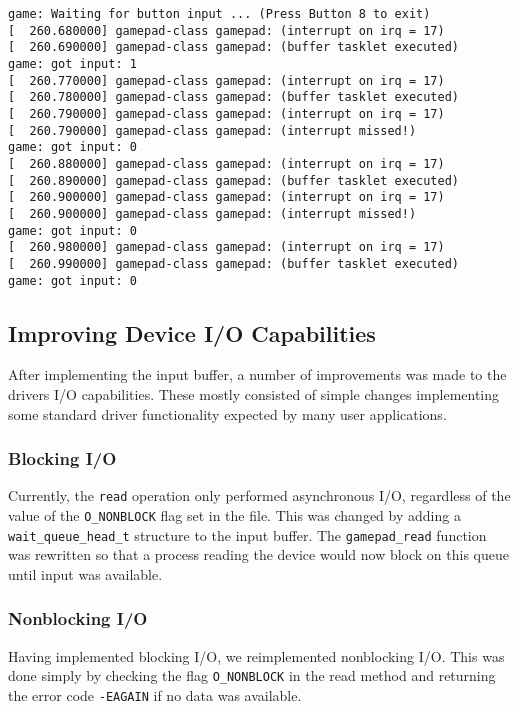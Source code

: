 \begin{lstlisting}[caption=Buffered read with rapid input. The program output was sorted.,label=lst:buffered-read-rapid-input]
game: Waiting for button input ... (Press Button 8 to exit)
[  260.680000] gamepad-class gamepad: (interrupt on irq = 17)
[  260.690000] gamepad-class gamepad: (buffer tasklet executed)
game: got input: 1
[  260.770000] gamepad-class gamepad: (interrupt on irq = 17)
[  260.780000] gamepad-class gamepad: (buffer tasklet executed)
[  260.790000] gamepad-class gamepad: (interrupt on irq = 17)
[  260.790000] gamepad-class gamepad: (interrupt missed!)
game: got input: 0
[  260.880000] gamepad-class gamepad: (interrupt on irq = 17)
[  260.890000] gamepad-class gamepad: (buffer tasklet executed)
[  260.900000] gamepad-class gamepad: (interrupt on irq = 17)
[  260.900000] gamepad-class gamepad: (interrupt missed!)
game: got input: 0
[  260.980000] gamepad-class gamepad: (interrupt on irq = 17)
[  260.990000] gamepad-class gamepad: (buffer tasklet executed)
game: got input: 0
\end{lstlisting}

\subsection{Improving Device I/O Capabilities}
After implementing the input buffer, a number of improvements was made to the drivers I/O capabilities. These mostly consisted of simple changes implementing some standard driver functionality expected by many user applications.

\subsubsection{Blocking I/O}
Currently, the \texttt{read} operation only performed asynchronous I/O, regardless of the value of the \texttt{O\_NONBLOCK} flag set in the file. This was changed by adding a \texttt{wait\_queue\_head\_t} structure to the input buffer. The \texttt{gamepad\_read} function was rewritten so that a process reading the device would now block on this queue until input was available.

\subsubsection{Nonblocking I/O}
Having implemented blocking I/O, we reimplemented nonblocking I/O. This was done simply by checking the flag \texttt{O\_NONBLOCK} in the read method and returning the error code \texttt{-EAGAIN} if no data was available.


